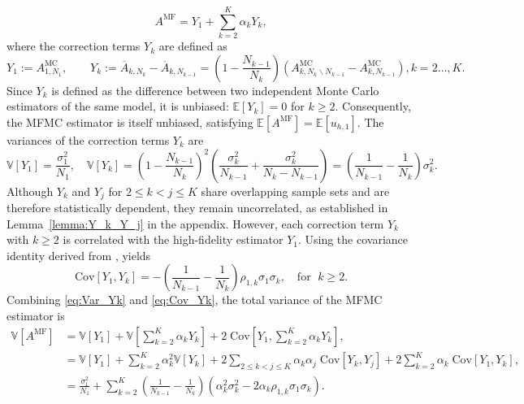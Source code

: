 %
\begin{equation*}\label{eq:MFMC_estimator_Correction}
A^{\text{MF}} = Y_1 + \sum_{k=2}^K \alpha_k Y_k,
\end{equation*}
%
where the correction terms $Y_k$ are defined as
%
\begin{equation} \label{eq:MFMC_Yk}
Y_1 :=A^{\text{MC}}_{1,N_1},\qquad Y_k:=\overline{A}_{k,N_k} - \overline{A}_{k,N_{k-1}}=\left(1-\frac{N_{k-1}}{N_{k}}\right)\left(A_{k,N_k\backslash N_{k-1}}^{\text{MC}}-A_{k,N_{k-1}}^{\text{MC}}\right), k=2\ldots, K.
\end{equation}
%
Since $Y_k$ is defined as the difference between two independent Monte Carlo estimators of the same model, it is unbiased: $\mathbb{E}[Y_k] = 0$ for $k\ge 2$. Consequently, the MFMC estimator is itself unbiased, satisfying $\mathbb{E}[A^{\text{MF}}] = \mathbb{E}[u_{h,1}]$. The variances of the correction terms $Y_k$ are
%
\begin{equation}\label{eq:Var_Yk}
    \mathbb{V}\left[Y_1\right] = \frac{\sigma_1^2}{N_1}, \quad \mathbb{V}\left[Y_k\right] = \left(1-\frac{N_{k-1}}{N_{k}}\right)^2\left(\frac{\sigma_k^2}{N_{k-1}}+\frac{\sigma_k^2}{N_k-N_{k-1}}\right) = \left(\frac{1}{N_{k-1}} - \frac{1}{N_k}\right)\sigma_k^2.
\end{equation}
%
Although $Y_k$ and $Y_j$ for $2\le k<j \le K$ share overlapping sample sets and are therefore statistically dependent, they remain uncorrelated, as established in Lemma~\ref{lemma:Y_k_Y_j} in the appendix. However, each correction term $Y_k$ with $k\ge 2$ is correlated with the high-fidelity estimator $Y_1$. Using the covariance identity derived from \cite[Lemma~3.2]{PeWiGu:2016}, yields
%
\begin{equation}\label{eq:Cov_Yk}
\text{Cov}[Y_1,Y_k] = - \left(\frac{1}{N_{k-1}} - \frac{1}{N_k}\right)\rho_{1,k}\sigma_1\sigma_k, \quad \text{for } \; k\ge 2.
\end{equation}
%
Combining \eqref{eq:Var_Yk} and \eqref{eq:Cov_Yk}, the total variance of the MFMC estimator is 
%
\begin{align}
    \nonumber
    \mathbb{V}\left[A^{\text{MF}}\right] &= \mathbb{V}\left[Y_1\right] + \mathbb{V}\left[\sum_{k=2}^K \alpha_kY_k\right]+2\;\text{Cov}\left[Y_1,\sum_{k=2}^K \alpha_k Y_k \right],\\
    \nonumber
    &=\mathbb{V}\left[Y_1\right] + \sum_{k=2}^K \alpha_k^2 \mathbb{V}\left[Y_k\right]+2\sum_{2\le k<j\le K} \alpha_k\alpha_j\; \text{Cov}[Y_k,Y_j] +2\sum_{k=2}^K \alpha_k\;\text{Cov}\left[Y_1, Y_k\right],\\
    \label{eq:MFMC_variance}
    &=\frac{\sigma_1^2}{N_1} + \sum_{k=2}^K \left(\frac{1}{N_{k-1}} - \frac{1}{N_k}\right)\left(\alpha_k^2\sigma_k^2 - 2\alpha_k\rho_{1,k}\sigma_1\sigma_k\right).
\end{align}
